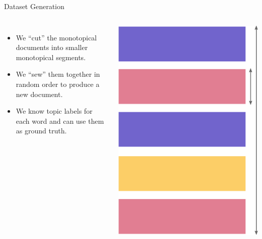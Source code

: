 \documentclass[russian]{beamer}
\begin{document}
\begin{frame}{Dataset Generation}
  \begin{columns}
    \begin{itemize}\setlength{\itemindent}{-1em} %
      \item We “cut” the monotopical documents into smaller monotopical segments.
      \item We “sew” them together in random order to produce a new document. 
      \item We know topic labels for each word and can use them as ground truth.
    \end{itemize}
    
  
    \includegraphics[width=0.95\linewidth, height=0.6\textheight]{dataset} %
  \end{columns}
  
  \medskip
  
\end{frame}
\end{document}
